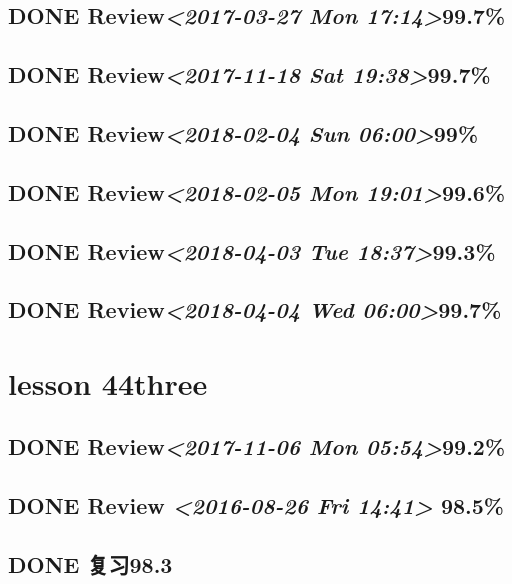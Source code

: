 \documentclass[11pt]{ctexart}
\begin{document}
\subsection{{\bfseries\sffamily DONE} Review\textit{<2017-03-27 Mon 17:14>}99.7\%}
\label{sec:org492929d}

\subsection{{\bfseries\sffamily DONE} Review\textit{<2017-11-18 Sat 19:38>}99.7\%}
\label{sec:org815bc0f}
\subsection{{\bfseries\sffamily DONE} Review\textit{<2018-02-04 Sun 06:00>}99\%}
\label{sec:orgcb74fde}
\subsection{{\bfseries\sffamily DONE} Review\textit{<2018-02-05 Mon 19:01>}99.6\%}
\label{sec:org2d7e1cd}
\subsection{{\bfseries\sffamily DONE} Review\textit{<2018-04-03 Tue 18:37>}99.3\%}
\label{sec:orgb6b750e}
\subsection{{\bfseries\sffamily DONE} Review\textit{<2018-04-04 Wed 06:00>}99.7\%}
\label{sec:org7014aa2}
\section{lesson 44three}
\label{sec:org72646f7}
\subsection{{\bfseries\sffamily DONE} Review\textit{<2017-11-06 Mon 05:54>}99.2\%}
\label{sec:org475383b}
\subsection{{\bfseries\sffamily DONE} Review \textit{<2016-08-26 Fri 14:41> } 98.5\%}
\label{sec:orgb645cf8}
\subsection{{\bfseries\sffamily DONE} 复习98.3}
\label{sec:org124e174}
\end{document}
